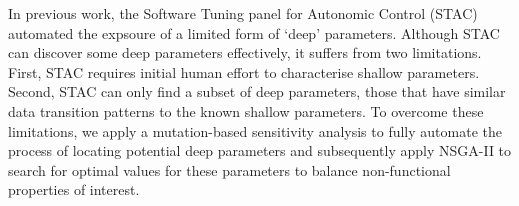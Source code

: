 In previous work, the Software Tuning panel for Autonomic Control 
(STAC)~\cite{Brake:2008:ADS:1370018.1370031} automated the expsoure of a
limited form of `deep' parameters. 
Although STAC
can discover some deep parameters effectively, it suffers from two
limitations. First, STAC requires initial human effort to characterise
shallow parameters. Second, STAC can only find a subset of deep parameters,
those that have similar data transition patterns to the known shallow
parameters. To overcome these limitations, we apply a mutation-based
sensitivity analysis to fully automate the process of locating potential
deep parameters and subsequently apply NSGA-II to search for optimal values
for these parameters to balance non-functional properties of interest. 

